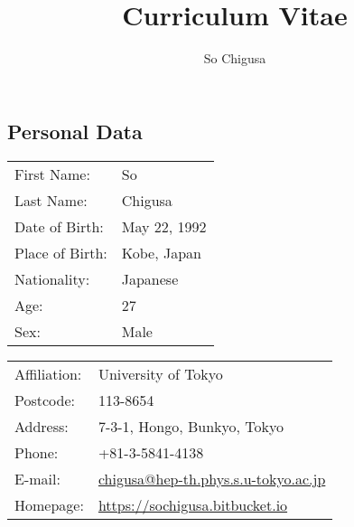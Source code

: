 \documentclass[12pt]{article}
\title{\vspace{-2cm}\textbf{Curriculum Vitae}}
\author{So Chigusa}
\begin{document}
\large
\maketitle

\newcommand{\lsim}{\stackrel{<}{_\sim}}
\newcommand{\gsim}{\stackrel{>}{_\sim}}

\newcommand{\rem}[1]{{$\spadesuit$\bf #1$\spadesuit$}}


\renewcommand{\thefootnote}{\arabic{footnote})}
\setcounter{footnote}{0}

\vspace{-5mm}
\subsection*{Personal Data}

\vspace{-3mm}

\begin{table}[h]
 \begin{tabular}{ll}
  First Name: & So %
      \\
  Last Name: & Chigusa %
      \\
  Date of Birth: & May 22, 1992 \\
  Place of Birth: & Kobe, Japan \\
  Nationality: & Japanese \\
  Age: & 27 \\
  Sex: & Male \\
 \end{tabular}
\end{table}

\vspace{-5mm}
\begin{table}[h]
 \begin{tabular}{ll}
  Affiliation: & University of Tokyo \\
  Postcode: & 113-8654 \\
  Address: & 7-3-1, Hongo, Bunkyo, Tokyo \\
  Phone: & +81-3-5841-4138 \\
  E-mail: &
      \href{mailto:chigusa@hep-th.phys.s.u-tokyo.ac.jp}{chigusa@hep-th.phys.s.u-tokyo.ac.jp}
      \\
  Homepage: & \url{https://sochigusa.bitbucket.io} \\
 \end{tabular}
\end{table}
\vspace{-5mm}
\end{document}
